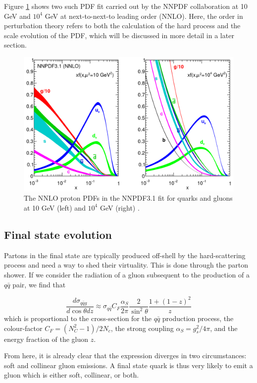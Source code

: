 \documentclass[10pt,a4paper]{book}
\begin{document}
Figure \ref{pdf} shows two such PDF fit carried out by the NNPDF collaboration at 10 GeV and $10^4$ GeV at next-to-next-to leading order (NNLO). Here, the order in perturbation theory refers to both the calculation of the hard process and the scale evolution of the PDF, which will be discussed in more detail in a later section.

\begin{figure}
    \centering
    \includegraphics[width=0.9\linewidth]{nnpdf}
    \caption{The NNLO proton PDFs in the NNPDF3.1 fit for quarks and gluons at 10 GeV (left) and $10^4$ GeV (right) \cite{NNPDF:2017mvq}.}
    \label{pdf}
\end{figure}

\subsection{Final state evolution}
Partons in the final state are typically produced off-shell by the hard-scattering process and need a way to shed their virtuality. This is done through the parton shower. If we consider the radiation of a gluon subsequent to the production of a $q\bar{q}$ pair, we find that

\begin{equation}
    \frac{d\sigma_{q\bar{q}g}}{d\cos\theta dz} \approx \sigma_{q\bar{q}}C_F\frac{\alpha_S}{2\pi}\frac{2}{\sin^2\theta}\frac{1 + (1 - z)^2}{z}
    \label{divergence}
\end{equation}
which is proportional to the cross-section for the $q\bar{q}$ production process, the colour-factor $C_F = (N_C^2 -1)/2N_c$, the strong coupling $\alpha_S = g_s^2/4\pi$, and the energy fraction of the gluon $z$.

From here, it is already clear that the expression diverges in two circumstances:  soft and collinear gluon emissions. A final state quark is thus very likely to emit a gluon which is either soft, collinear, or both. 
\end{document}
